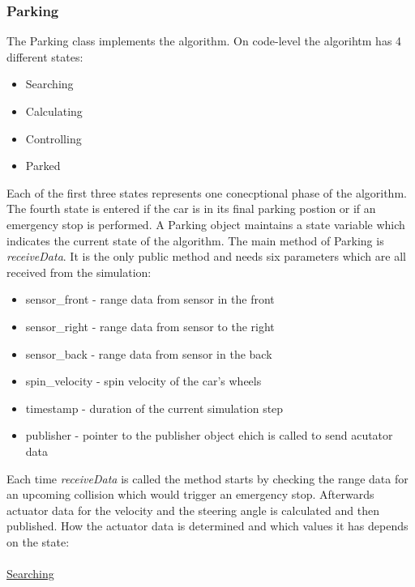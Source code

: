 \documentclass[paper=a4, fontsize=11pt]{scrreprt}
\begin{document}
\subsubsection{Parking} \label{parking}
The Parking class implements the algorithm. On code-level the algorihtm has 4 different states:
\begin{itemize}
	\item Searching
	\item Calculating
	\item Controlling
	\item Parked
\end{itemize}
Each of the first three states represents one conecptional phase of the algorithm. The fourth state is entered if the car is in its final parking postion or if an emergency stop is performed. A Parking object maintains a state variable which indicates the current state of the algorithm. The main method of Parking is \textit{receiveData}. It is the only public method and needs six parameters which are all received from the simulation:
\begin{itemize}
	\item sensor\_front - range data from sensor in the front
	\item sensor\_right - range data from sensor to the right
	\item sensor\_back - range data from sensor in the back
	\item spin\_velocity - spin velocity of the car's wheels
	\item timestamp - duration of the current simulation step 
	\item publisher - pointer to the publisher object ehich is called to send acutator data
\end{itemize}
Each time \textit{receiveData} is called the method starts by checking the range data for an upcoming collision which would trigger an emergency stop. Afterwards actuator data for the velocity and the steering angle is calculated and then published. How the actuator data is determined and which values it has depends on the state:\\
\\
\underline{Searching}\\
\end{document}
